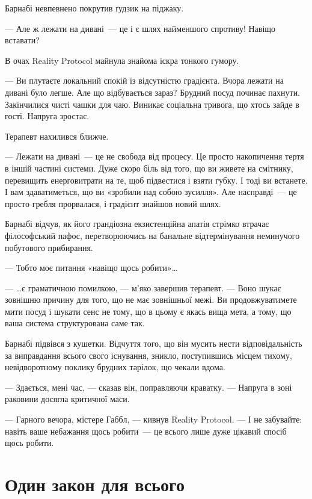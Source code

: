 \documentclass[12pt, a4paper, openany]{book}
\begin{document}
\begin{realitybox}
\medskip
Барнабі невпевнено покрутив ґудзик на піджаку.

--- Але ж лежати на дивані~--- це і є шлях найменшого спротиву! Навіщо вставати?

В очах Reality Protocol майнула знайома іскра тонкого гумору.

--- Ви плутаєте локальний спокій із відсутністю градієнта. Вчора лежати на дивані було легше. Але що відбувається зараз? Брудний посуд починає пахнути. Закінчилися чисті чашки для чаю. Виникає соціальна тривога, що хтось зайде в гості. Напруга зростає.

Терапевт нахилився ближче.

--- Лежати на дивані~--- це не свобода від процесу. Це просто накопичення тертя в іншій частині системи. Дуже скоро біль від того, що ви живете на смітнику, перевищить енерговитрати на те, щоб підвестися і взяти губку. І тоді ви встанете. І вам здаватиметься, що ви «зробили над собою зусилля». Але насправді~--- це просто гребля прорвалася, і градієнт знайшов новий шлях.

\medskip
Барнабі відчув, як його грандіозна екзистенційна апатія стрімко втрачає філософський пафос, перетворюючись на банальне відтермінування неминучого побутового прибирання.

--- Тобто моє питання «навіщо щось робити»\ldots

--- \ldots є граматичною помилкою, --- м'яко завершив терапевт. --- Воно шукає зовнішню причину для того, що не має зовнішньої межі. Ви продовжуватимете мити посуд і шукати сенс не тому, що в цьому є якась вища мета, а тому, що ваша система структурована саме так.

\medskip
Барнабі підвівся з кушетки. Відчуття того, що він мусить нести відповідальність за виправдання всього свого існування, зникло, поступившись місцем тихому, невідворотному поклику брудних тарілок, що чекали вдома.

--- Здається, мені час, --- сказав він, поправляючи краватку. --- Напруга в зоні раковини досягла критичної маси.

--- Гарного вечора, містере Габбл, --- кивнув Reality Protocol. --- І не забувайте: навіть ваше небажання щось робити~--- це всього лише дуже цікавий спосіб щось робити.
\end{realitybox}

\part{Один закон для всього}
\end{document}
